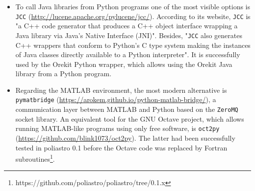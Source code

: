 \begin{itemize}
\item To call Java libraries from Python programs one of the most visible options is \verb|JCC| (\url{http://lucene.apache.org/pylucene/jcc/}). According to its website, \verb|JCC| is "a C++ code generator that produces a C++ object interface wrapping a Java library via Java's Native Interface (JNI)". Besides, "\verb|JCC| also generates C++ wrappers that conform to Python's C type system making the instances of Java classes directly available to a Python interpreter". It is successfully used by the Orekit Python wrapper, which allows using the Orekit Java library from a Python program.
\item Regarding the MATLAB environment, the most modern alternative is \verb|pymatbridge| (\url{https://arokem.github.io/python-matlab-bridge/}), a communication layer between MATLAB and Python based on the \verb|ZeroMQ| socket library\cite{hintjens2013zeromq}. An equivalent tool for the GNU Octave project\cite{eaton1997gnu}, which allows running MATLAB-like programs using only free software, is \verb|oct2py| (\url{https://github.com/blink1073/oct2py}). The latter had been successfully tested in poliastro 0.1 before the Octave code was replaced by Fortran subroutines\footnote{https://github.com/poliastro/poliastro/tree/0.1.x}.
\end{itemize}